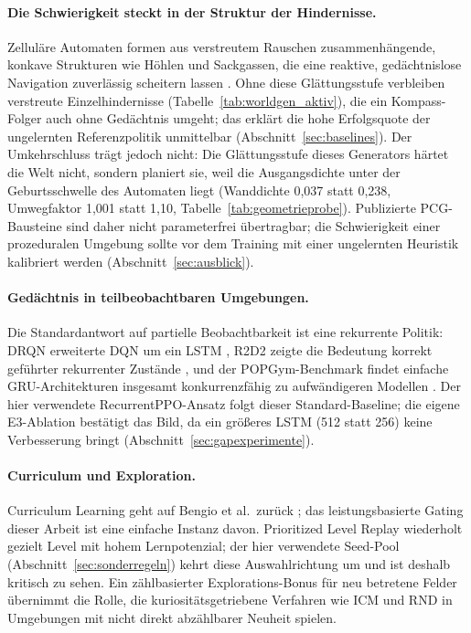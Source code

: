 \documentclass[11pt,a4paper]{article}
\begin{document}
\paragraph{Die Schwierigkeit steckt in der Struktur der Hindernisse.}
Zelluläre Automaten formen aus verstreutem Rauschen zusammenhängende,
konkave Strukturen wie Höhlen und Sackgassen, die eine reaktive,
gedächtnislose Navigation zuverlässig scheitern lassen
\cite{johnson2010cellular, shaker2016pcg}. Ohne diese Glättungsstufe
verbleiben verstreute Einzelhindernisse (Tabelle~\ref{tab:worldgen_aktiv}),
die ein Kompass-Folger auch ohne Gedächtnis umgeht; das erklärt die hohe
Erfolgsquote der ungelernten Referenzpolitik unmittelbar
(Abschnitt~\ref{sec:baselines}). Der Umkehrschluss trägt jedoch nicht: Die
Glättungsstufe dieses Generators härtet die Welt nicht, sondern planiert
sie, weil die Ausgangsdichte unter der Geburtsschwelle des Automaten liegt
(Wanddichte 0,037 statt 0,238, Umwegfaktor 1,001 statt 1,10,
Tabelle~\ref{tab:geometrieprobe}). Publizierte PCG-Bausteine sind daher
nicht parameterfrei übertragbar; die Schwierigkeit einer prozeduralen
Umgebung sollte vor dem Training mit einer ungelernten Heuristik kalibriert
werden (Abschnitt~\ref{sec:ausblick}).

\paragraph{Gedächtnis in teilbeobachtbaren Umgebungen.}
Die Standardantwort auf partielle Beobachtbarkeit ist eine rekurrente
Politik: DRQN erweiterte DQN um ein LSTM \cite{hausknecht2015drqn}, R2D2
zeigte die Bedeutung korrekt geführter rekurrenter Zustände
\cite{kapturowski2019r2d2}, und der POPGym-Benchmark findet einfache
GRU-Architekturen insgesamt konkurrenzfähig zu aufwändigeren Modellen
\cite{morad2023popgym}. Der hier verwendete RecurrentPPO-Ansatz
\cite{pleines2022recurrent} folgt dieser Standard-Baseline; die eigene
E3-Ablation bestätigt das Bild, da ein größeres LSTM (512 statt 256) keine
Verbesserung bringt (Abschnitt~\ref{sec:gapexperimente}).

\paragraph{Curriculum und Exploration.}
Curriculum Learning geht auf Bengio et al.\ zurück
\cite{bengio2009curriculum}; das leistungsbasierte Gating dieser Arbeit ist
eine einfache Instanz davon. Prioritized Level Replay \cite{jiang2021plr}
wiederholt gezielt Level mit hohem Lernpotenzial; der hier verwendete
Seed-Pool (Abschnitt~\ref{sec:sonderregeln}) kehrt diese Auswahlrichtung um und
ist deshalb kritisch zu sehen. Ein zählbasierter Explorations-Bonus für neu
betretene Felder übernimmt die Rolle, die kuriositätsgetriebene Verfahren
wie ICM \cite{pathak2017icm} und RND \cite{burda2018rnd} in Umgebungen mit
nicht direkt abzählbarer Neuheit spielen.
\end{document}
